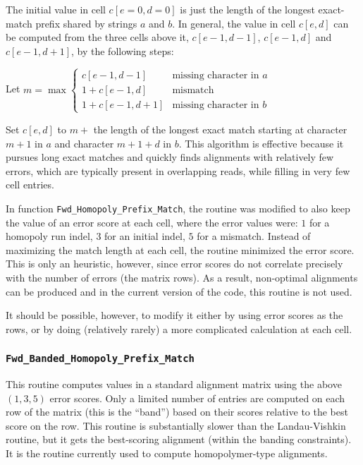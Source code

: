 \documentclass[letterpaper,11pt]{article}
\def\Pgm#1{\texttt{#1}}
\begin{document}
The initial value in cell $c[e=0,d=0]$ is just the length of the longest
exact-match prefix shared by strings $a$ and $b$.  In general, the value
in cell $c[e,d]$ can be computed from the three cells above it, $c[e-1,d-1]$,
$c[e-1,d]$ and $c[e-1,d+1]$, by the following steps:
\bn
\item
  Let $m = \max \left\{\begin{array}{ll}
    c[e-1,d-1] & \mbox{missing character in $a$}\\
    1 + c[e-1,d] & \mbox{mismatch} \\
    1 + c[e-1,d+1] & \mbox{missing character in $b$}
  \end{array} \right.$
\item
  Set $c[e,d]$ to $m +$ the length of the longest exact match starting
  at character $m+1$ in $a$ and character $m+1+d$ in $b$.
\en
This algorithm is effective because it pursues long exact matches
and quickly finds alignments with relatively few errors, which are
typically present in overlapping reads, while filling in very few
cell entries.

In function \verb`Fwd_Homopoly_Prefix_Match`, the routine was modified
to also keep the value of an error score at each cell, where the
error values were:  $1$ for a homopoly run indel, $3$ for an initial indel,
$5$ for a mismatch.  Instead of maximizing the match length at each cell,
the routine minimized the error score.  This is only an heuristic, however,
since error scores do not correlate precisely with the number of errors (the matrix
rows).  As a result, non-optimal alignments can be produced and in the current
version of the code, this routine is not used.

It should be possible, however,
to modify it either by using error scores as the rows, or by
doing (relatively rarely) a more complicated calculation at each cell.

\subsubsection{\Pgm{Fwd\_Banded\_Homopoly\_Prefix\_Match}}

This routine computes values in a standard alignment matrix using the above $(1,3,5)$
error scores.  Only a limited number of entries are computed on each row
of the matrix (this is the ``band'') based on their scores relative to the best
score on the row.  This routine is substantially slower than the
Landau-Vishkin routine, but it gets the best-scoring alignment (within
the banding constraints).  It is the routine currently used to
compute homopolymer-type alignments.
\end{document}
